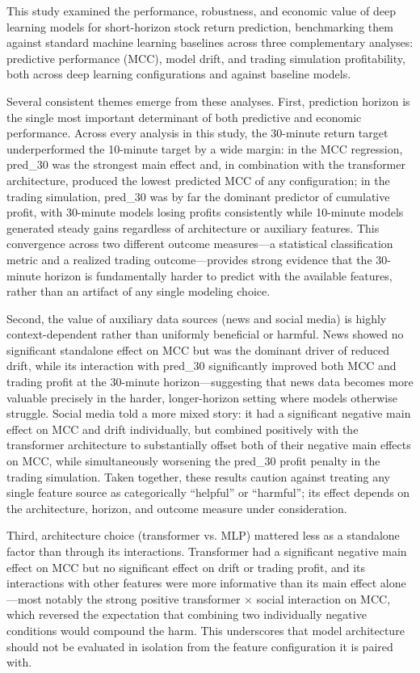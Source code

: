 \documentclass[stu,floatsintext]{apa7}
\begin{document}
This study examined the performance, robustness, and economic value of deep learning models for short-horizon stock return prediction, benchmarking them against standard machine learning baselines across three complementary analyses: predictive performance (MCC), model drift, and trading simulation profitability, both across deep learning configurations and against baseline models.

Several consistent themes emerge from these analyses. First, prediction horizon is the single most important determinant of both predictive and economic performance. Across every analysis in this study, the 30-minute return target underperformed the 10-minute target by a wide margin: in the MCC regression, pred\_30 was the strongest main effect and, in combination with the transformer architecture, produced the lowest predicted MCC of any configuration; in the trading simulation, pred\_30 was by far the dominant predictor of cumulative profit, with 30-minute models losing profits consistently while 10-minute models generated steady gains regardless of architecture or auxiliary features. This convergence across two different outcome measures---a statistical classification metric and a realized trading outcome---provides strong evidence that the 30-minute horizon is fundamentally harder to predict with the available features, rather than an artifact of any single modeling choice.

Second, the value of auxiliary data sources (news and social media) is highly context-dependent rather than uniformly beneficial or harmful. News showed no significant standalone effect on MCC but was the dominant driver of reduced drift, while its interaction with pred\_30 significantly improved both MCC and trading profit at the 30-minute horizon---suggesting that news data becomes more valuable precisely in the harder, longer-horizon setting where models otherwise struggle. Social media told a more mixed story: it had a significant negative main effect on MCC and drift individually, but combined positively with the transformer architecture to substantially offset both of their negative main effects on MCC, while simultaneously worsening the pred\_30 profit penalty in the trading simulation. Taken together, these results caution against treating any single feature source as categorically ``helpful'' or ``harmful''; its effect depends on the architecture, horizon, and outcome measure under consideration.

Third, architecture choice (transformer vs. MLP) mattered less as a standalone factor than through its interactions. Transformer had a significant negative main effect on MCC but no significant effect on drift or trading profit, and its interactions with other features were more informative than its main effect alone---most notably the strong positive transformer $\times$ social interaction on MCC, which reversed the expectation that combining two individually negative conditions would compound the harm. This underscores that model architecture should not be evaluated in isolation from the feature configuration it is paired with.
\end{document}
